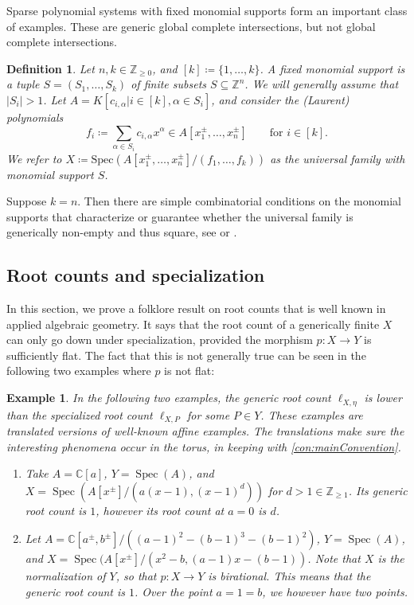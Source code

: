 \documentclass[12pt,reqno,a4paper]{amsart}
\theoremstyle{theoremstyle}
\theoremstyle{examplestyle}
\newtheorem{example}[theorem]{Example}
\newtheorem{definition}[theorem]{Definition}
\theoremstyle{algorithmstyle}
\newcommand{\CC}{\mathbb{C}}
\newcommand{\ZZ}{\mathbb{Z}}
\DeclareMathOperator{\Spec}{Spec}
\begin{document}
Sparse polynomial systems with fixed monomial supports form an important class of examples.  These are generic global complete intersections, but not global complete intersections.

\begin{definition}
  \label{def:UniversalFamilies}
  Let $n,k\in\mathbb{Z}_{\geq 0}$, and $[k]\coloneqq\{1,\dots,k\}$. A \emph{fixed monomial support} is a tuple $S=(S_1,\dots,S_k)$ of finite subsets $S\subseteq \ZZ^n$.  We will generally assume that $|S_i|>1$.
  Let $A=K[c_{i,\alpha}| i\in [k], \alpha\in S_i]$, and consider the (Laurent) polynomials
  \begin{equation*}
    f_{i}\coloneqq\sum_{\alpha\in S_i} c_{i,\alpha} x^{\alpha}\in A[x_1^{\pm},\dots,x_n^{\pm}] \qquad\text{for }i\in [k].
  \end{equation*}
  We refer to $X\coloneqq\mathrm{Spec}(A[x_1^{\pm},\dots,x_n^{\pm}]/(f_{1},\dots,f_{k}))$ as the \emph{universal family} with monomial support $S$. %
\end{definition}

Suppose $k=n$. Then there are 
 simple combinatorial conditions on the monomial supports that characterize or guarantee whether the universal family is generically non-empty and thus square, see %
 \cite[Theorem 2.2]{Esterov2019} or \cite[Theorem 3]{Yu16}. 

\subsection{Root counts and specialization}
In this section, we prove a folklore result on root counts that is well known in applied algebraic geometry. It says that the root count of a generically finite $X$ can only go down under specialization, provided the morphism $p\colon X\rightarrow Y$ is sufficiently flat.  The fact that this is not generally true can be seen in the following two examples where $p$ is not flat:

\begin{example}
  \label{exa:CounterExampleRC}
  In the following two examples, the generic root count $\ell_{X,\eta}$ is lower than the specialized root count $\ell_{X,P}$ for some $P\in Y$. These examples are translated versions of well-known affine examples. The translations make sure the interesting phenomena occur in the torus, in keeping with  
  \cref{con:mainConvention}. %
  \begin{enumerate}[leftmargin=*]
  \item Take $A=\CC[a]$, $Y=\Spec(A)$, and $X=\Spec(A[x^\pm]/(a(x-1),(x-1)^d))$ for $d>1\in \mathbb{Z}_{\geq{1}}$. Its generic root count is $1$, however its root count at $a=0$ is $d$.
  \item Let $A=\CC[a^{\pm},b^{\pm}]/((a-1)^2-(b-1)^3-(b-1)^2)$, $Y=\Spec(A)$, and $X=\Spec(A[x^\pm]/(x^2-b,(a-1)x-(b-1))$. Note that $X$ is the normalization of $Y$, so that $p\colon X\to Y$ is birational. This means that the generic root count is $1$. Over the point $a=1=b$, we however have two points.
  \end{enumerate}
\end{example}
\end{document}
